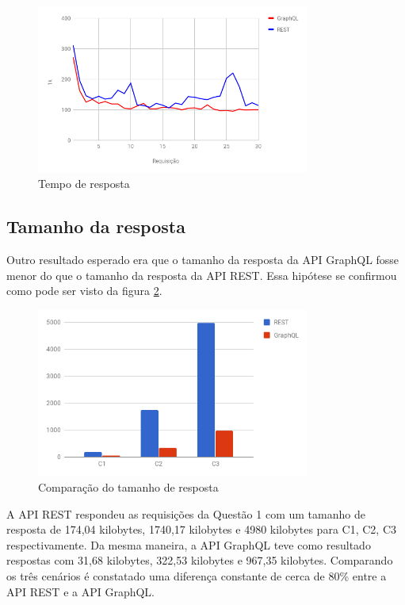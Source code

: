 \begin{figure}[htbp]
    \centering
    \includegraphics[width=0.8\textwidth]{figuras/q1-time-line.png}
    \caption{Tempo de resposta}
    \label{fig:q1-time-line}
    \author{fonte: Autor}
\end{figure}

\subsection{Tamanho da resposta}

Outro resultado esperado era que o tamanho da resposta da API GraphQL fosse menor do que o tamanho da resposta da API REST. Essa hipótese se confirmou como pode ser visto da figura \ref{fig:q1-size}.

\begin{figure}[htbp]
    \centering
    \includegraphics[width=0.8\textwidth]{figuras/q1-size.png}
    \caption{Comparação do tamanho de resposta}
    \label{fig:q1-size}
    \author{fonte: Autor}
\end{figure}

A API REST respondeu as requisições da Questão 1 com um tamanho de resposta de 174,04 kilobytes, 1740,17 kilobytes e 4980 kilobytes para C1, C2, C3 respectivamente. Da mesma maneira, a API GraphQL teve como resultado respostas com 31,68 kilobytes, 322,53 kilobytes e 967,35 kilobytes. Comparando os três cenários é constatado uma diferença constante de cerca de 80\% entre a API REST e a API GraphQL.

